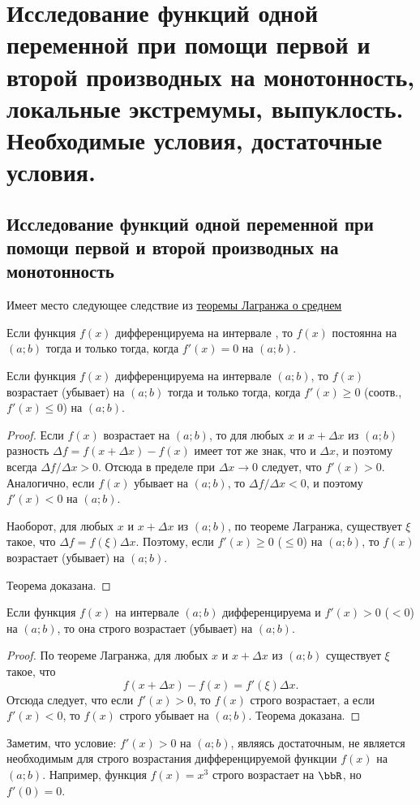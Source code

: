 \chapter{Исследование функций одной переменной при помощи первой и второй производных на монотонность, локальные экстремумы, выпуклость. Необходимые условия, достаточные условия.}

\section{Исследование функций одной переменной при помощи первой и второй производных на монотонность}

Имеет место следующее следствие из \hyperref[ch4t1]{теоремы Лагранжа о среднем}
\begin{thm} 
Если функция $f(x)$ дифференцируема на интервале , то $f(x)$ постоянна на $(a;b)$ тогда и только тогда, когда $f'(x)=0$ на $(a;b)$.
\end{thm}
 
\begin{thm}  Если функция $f(x)$ дифференцируема на интервале $(a;b)$, то $f(x)$ возрастает (убывает) на $(a;b)$ тогда и только тогда, когда $f'(x)\ge 0$ (соотв., $f'(x)\le 0$) на $(a;b)$.
\end{thm}
\begin{proof} Если $f(x)$ возрастает на $(a;b)$, то для любых $x$ и $x+\Delta x$ из $(a;b)$ разность $\Delta f = f(x+\Delta x) - f(x)$ имеет тот же знак, что и $\Delta x$, и поэтому всегда $\Delta f/\Delta x > 0$. Отсюда в пределе при $\Delta x \to 0$ следует, что $f'(x) > 0$. Аналогично, если $f(x)$ убывает на $(a;b)$, то $\Delta f/\Delta x < 0$, и поэтому $f'(x) < 0$ на $(a;b)$.

Наоборот, для любых $x$ и $x + \Delta x$ из $(a;b)$, по теореме Лагранжа, существует $\xi$ такое, что $\Delta f = f(\xi)\Delta x$. Поэтому, если $f'(x) \ge 0$ ($\le 0$) на $(a;b)$, то $f(x)$ возрастает (убывает) на $(a;b)$.

\noindent Теорема доказана.
\end{proof}

\begin{thm}  Если функция $f(x)$ на интервале $(a;b)$ дифференцируема и $f'(x) > 0$ ($< 0$) на $(a;b)$, то она строго возрастает (убывает) на $(a;b)$.
\end{thm}
\begin{proof}
По теореме Лагранжа, для любых $x$ и $x + \Delta x$ из $(a; b)$ существует $\xi$ такое, что
$$
f(x+\Delta x)-f(x)=f'(\xi)\Delta x.
$$
Отсюда следует, что если $f'(x) > 0$, то $f(x)$ строго возрастает, а если $f'(x) < 0$, то $f(x)$ строго убывает на $(a;b)$. 
\noindent
Теорема доказана.
\end{proof}
Заметим, что условие: $f'(x) > 0$ на $(a;b)$, являясь достаточным, не является необходимым для строго возрастания дифференцируемой функции $f(x)$ на $(a;b)$. Например, функция $f(x) = x^3$ строго возрастает на $\bbR$, но $f'(0) = 0$.


